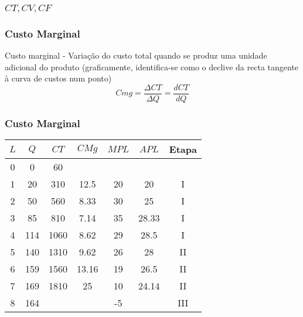 \begin{frame}
	\frametitle{$CT,CV,CF$}
	\begin{center}
	\end{center}
\end{frame}

\begin{frame}
	\frametitle{Custo Marginal}
	Custo marginal - Varia\c c\~ao do custo total quando se produz uma unidade adicional do produto (graficamente, identifica-se como o declive da recta tangente \`a curva de custos num ponto) \[Cmg=\frac{\Delta CT}{\Delta Q}=\frac{d CT}{d Q}\]
\end{frame}

\begin{frame}
	\frametitle{Custo Marginal}
	\begin{center}
		{
		\renewcommand{\arraystretch}{1.1}
		\begin{tabular}{ccccccc}
			$L$ & $Q$ & $CT$ & $CMg$ & $MPL$ & $APL$ & Etapa \\\hline \hline
			0 & 0 & 60 & & & & \\
			1 & 20 & 310 & 12.5 & 20 & 20 & I \\
			2 & 50 & 560 & 8.33 & 30 & 25 & I \\
			3 & 85 & 810 & 7.14 & 35 & 28.33 & I \\
			4 & 114 & 1060 & 8.62 & 29 & 28.5 & I \\
			5 & 140 & 1310 & 9.62 & 26 & 28 & II \\
			6 & 159 & 1560 & 13.16 & 19 & 26.5 & II \\
			7 & 169 & 1810 & 25 & 10 & 24.14 & II \\
			8 & 164 &  &  & -5  &  & III
		\end{tabular}
		}
	\end{center}
\end{frame}

